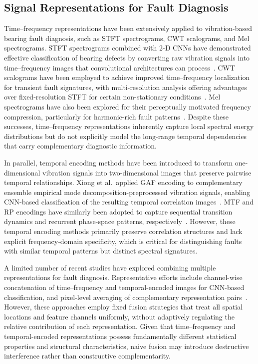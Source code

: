 \documentclass[pdflatex,sn-mathphys-num]{sn-jnl}
\theoremstyle{thmstyleone}%
\theoremstyle{thmstyletwo}%
\theoremstyle{thmstylethree}%
\begin{document}
\subsection{Signal Representations for Fault Diagnosis}

Time--frequency representations have been extensively applied to vibration-based bearing fault diagnosis, such as STFT spectrograms, CWT scalograms, and Mel spectrograms. STFT spectrograms combined with 2-D CNNs have demonstrated effective classification of bearing defects by converting raw vibration signals into time--frequency images that convolutional architectures can process~\cite{11028059,Xin_2019}. CWT scalograms have been employed to achieve improved time--frequency localization for transient fault signatures, with multi-resolution analysis offering advantages over fixed-resolution STFT for certain non-stationary conditions~\cite{SHAALAN2026103187}. Mel spectrograms have also been explored for their perceptually motivated frequency compression, particularly for harmonic-rich fault patterns~\cite{10929672}. Despite these successes, time--frequency representations inherently capture local spectral energy distributions but do not explicitly model the long-range temporal dependencies that carry complementary diagnostic information.

In parallel, temporal encoding methods have been introduced to transform one-dimensional vibration signals into two-dimensional images that preserve pairwise temporal relationships. Xiong et al.\ applied GAF encoding to complementary ensemble empirical mode decomposition-preprocessed vibration signals, enabling CNN-based classification of the resulting temporal correlation images~\cite{10109681}. MTF and RP encodings have similarly been adopted to capture sequential transition dynamics and recurrent phase-space patterns, respectively~\cite{11303191,10684078}. However, these temporal encoding methods primarily preserve correlation structures and lack explicit frequency-domain specificity, which is critical for distinguishing faults with similar temporal patterns but distinct spectral signatures.

A limited number of recent studies have explored combining multiple representations for fault diagnosis. Representative efforts include channel-wise concatenation of time--frequency and temporal-encoded images for CNN-based classification, and pixel-level averaging of complementary representation pairs~\cite{10214203}. However, these approaches employ fixed fusion strategies that treat all spatial locations and feature channels uniformly, without adaptively regulating the relative contribution of each representation. Given that time--frequency and temporal-encoded representations possess fundamentally different statistical properties and structural characteristics, naive fusion may introduce destructive interference rather than constructive complementarity.
\end{document}
